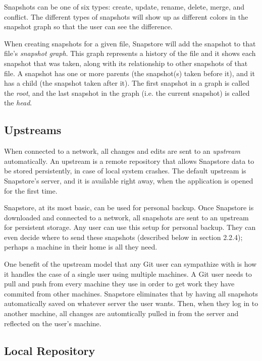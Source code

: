 Snapshots can be one of six types: create, update, rename, delete, merge, and conflict. The different types of snapshots will show up as different colors in the snapshot graph so that the user can see the difference.

When creating snapshots for a given file, Snapstore will add the snapshot to that file's \textit{snapshot graph}. This graph represents a history of the file and it shows each snapshot that was taken, along with its relationship to other snapshots of that file. A snapshot has one or more parents (the snapshot(s) taken before it), and it has a child (the snapshot taken after it). The first snapshot in a graph is called the \textit{root}, and the last snapshot in the graph (i.e. the current snapshot) is called the \textit{head}.

\subsection{Upstreams}

When connected to a network, all changes and edits are sent to an \textit{upstream} automatically. An upstream is a remote repository that allows Snapstore data to be stored persistently, in case of local system crashes. The default upstream is Snapstore's server, and it is available right away, when the application is opened for the first time.

Snapstore, at its most basic, can be used for personal backup. Once Snapstore is downloaded and connected to a network, all snapshots are sent to an upstream for persistent storage. Any user can use this setup for personal backup. They can even decide where to send these snapshots (described below in section 2.2.4); perhaps a machine in their home is all they need.

One benefit of the upstream model that any Git user can sympathize with is how it handles the case of a single user using multiple machines. A Git user needs to pull and push from every machine they use in order to get work they have commited from other machines. Snapstore eliminates that by having all snapshots automatically saved on whatever server the user wants. Then, when they log in to another machine, all changes are automtically pulled in from the server and reflected on the user's machine.

\subsection{Local Repository}

